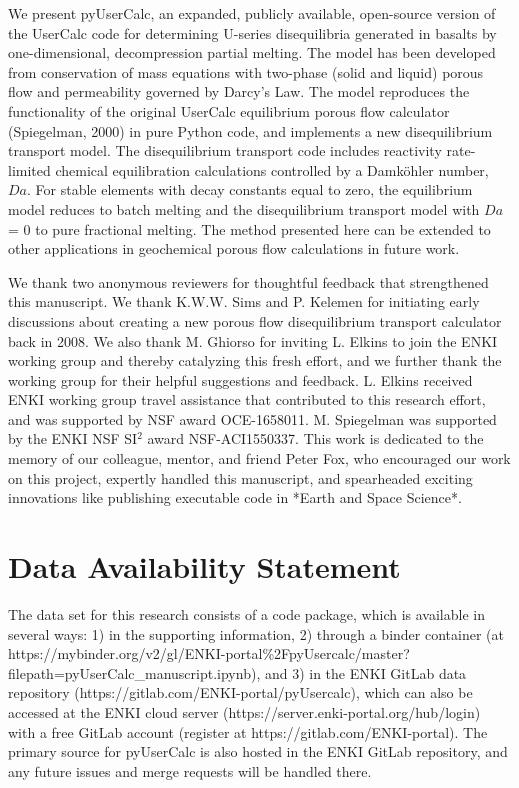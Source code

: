 \documentclass[draft]{agujournal2019}
\begin{document}
We present pyUserCalc, an expanded, publicly available, open-source version of the UserCalc code for determining U-series disequilibria generated in basalts by one-dimensional, decompression partial melting. The model has been developed from conservation of mass equations with two-phase (solid and liquid) porous flow and permeability governed by Darcy's Law. The model reproduces the functionality of the original UserCalc equilibrium porous flow calculator (Spiegelman, 2000) in pure Python code, and implements a new disequilibrium transport model. The disequilibrium transport code includes reactivity rate-limited chemical equilibration calculations controlled by a Damk\"{o}hler number, $Da$. For stable elements with decay constants equal to zero, the equilibrium model reduces to batch melting and the disequilibrium transport model with $Da$ = 0 to pure fractional melting. The method presented here can be extended to other applications in geochemical porous flow calculations in future work.


\acknowledgments

We thank two anonymous reviewers for thoughtful feedback that strengthened this manuscript. We thank K.W.W. Sims and P. Kelemen for initiating early discussions about creating a new porous flow disequilibrium transport calculator back in 2008. We also thank M. Ghiorso for inviting L. Elkins to join the ENKI working group and thereby catalyzing this fresh effort, and we further thank the working group for their helpful suggestions and feedback. L. Elkins received ENKI working group travel assistance that contributed to this research effort, and was supported by NSF award OCE-1658011. M. Spiegelman was supported by the ENKI NSF SI$^2$ award NSF-ACI1550337. This work is dedicated to the memory of our colleague, mentor, and friend Peter Fox, who encouraged our work on this project, expertly handled this manuscript, and spearheaded exciting innovations like publishing executable code in *Earth and Space Science*.


\section*{Data Availability Statement}

The data set for this research consists of a code package, which is available in several ways: 1) in the supporting information, 2) through a binder container (at https://mybinder.org/v2/gl/ENKI-portal\%2FpyUsercalc/master?filepath=pyUserCalc\_manuscript.ipynb), and 3) in the ENKI GitLab data repository (https://gitlab.com/ENKI-portal/pyUsercalc), which can also be accessed at the ENKI cloud server (https://server.enki-portal.org/hub/login) with a free GitLab account (register at https://gitlab.com/ENKI-portal). The primary source for pyUserCalc is also hosted in the ENKI GitLab repository, and any future issues and merge requests will be handled there.
\end{document}

